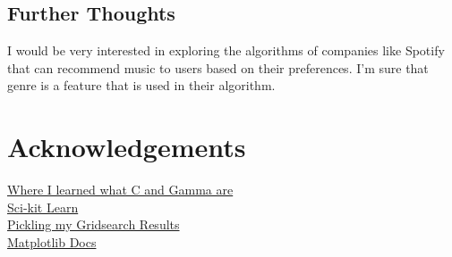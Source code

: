 \documentclass[12pt]{article}
\newcommand{\nextproblem}{
	\vfill
	\pagebreak
}
\begin{document}
\subsection{Further Thoughts}
I would be very interested in exploring the algorithms of companies like Spotify that can recommend music to users based on their preferences. I'm sure that genre is a feature that is used in their algorithm. 

\nextproblem

\section{Acknowledgements}

\href{https://www.quora.com/What-are-C-and-gamma-with-regards-to-a-support-vector-machine}{Where I learned what C and Gamma are} \\
\href{https://scikit-learn.org/stable/index.html}{Sci-kit Learn} \\
\href{https://machinelearningmastery.com/save-load-machine-learning-models-python-scikit-learn/}{Pickling my Gridsearch Results} \\
\href{https://matplotlib.org/3.1.1/contents.html}{Matplotlib Docs} \\
\end{document}
